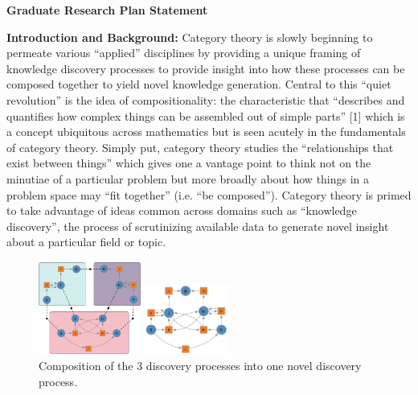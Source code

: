 \documentclass[11pt]{extarticle}
\begin{document}
\textbf{Graduate Research Plan Statement}

\textbf{Introduction and Background:} Category theory is slowly beginning to permeate various ``applied'' disciplines by providing a unique framing of knowledge discovery processes to provide insight into how these processes can be composed together to yield novel knowledge generation. %
Central to this ``quiet revolution'' is the idea of compositionality: the characteristic that ``describes and quantifies how complex things can be assembled out of simple parts'' [1] which is a concept ubiquitous across mathematics but is seen acutely in the fundamentals of category theory.
Simply put, category theory studies the ``relationships that exist between things'' which gives one a vantage point to think not on the minutiae of a particular problem but more broadly about how things in a problem space may ``fit together'' (i.e. ``be composed'').
Category theory is primed to take advantage of ideas common across domains such as ``knowledge discovery'', the process of scrutinizing available data to generate novel insight about a particular field or topic. %

\begin{figure}
\centering
\includegraphics[width=0.3\textwidth]{sub_models}
\vspace{-15pt}
\caption{
  3 discovery processes (the three different petri nets in boxes) with relationships defined by arrows and lines inside of and between processes. %
}
\vspace{10pt}
\includegraphics[width=0.25\textwidth]{composed_model}
\vspace{-10pt}
\caption{
  Composition of the 3 discovery processes into one novel discovery process. %
}
\end{figure}
\end{document}
